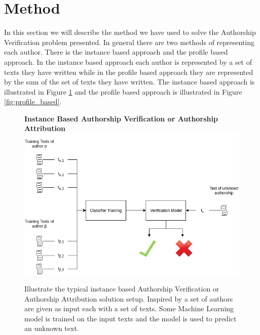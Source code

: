 \section{Method} \label{sec:method}

In this section we will describe the method we have used to solve the Authorship
Verification problem presented. In general there are two methods of representing
each author. There is the instance based approach and the profile based
approach. In the instance based approach each author is represented by a set of
texts they have written while in the profile based approach they are represented
by the sum of the set of texts they have written. The instance based approach is
illustrated in Figure \ref{fig:instance_based} and the profile based approach is
illustrated in Figure \ref{fig:profile_based}.

\begin{figure}[htb]
    \centering
    \textbf{Instance Based Authorship Verification or Authorship Attribution}
    \includegraphics[scale=0.5]{./pictures/method/InstanceBased.png}

    \caption{Illustrate the typical instance based Authorship Verification or
    Authorship Attribution solution setup. Inspired by \cite{stamatos2009} a
    set of authors are given as input each with a set of texts. Some Machine
    Learning model is trained on the input texts and the model is used to
    predict an unknown text. }

    \label{fig:instance_based}
\end{figure}

